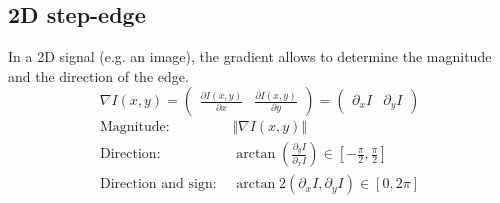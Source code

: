 \subsection{2D step-edge}

In a 2D signal (e.g. an image), the gradient allows to determine the magnitude and the direction of the edge.
\[ 
    \nabla I(x, y) = 
    \begin{pmatrix} \frac{\partial I(x, y)}{\partial x} & \frac{\partial I(x, y)}{\partial y} \end{pmatrix} =
    \begin{pmatrix} \partial_x I & \partial_y I \end{pmatrix}
\]
\[
    \begin{split}
        \text{Magnitude: } & \Vert \nabla I(x, y) \Vert \\
        \text{Direction: } & \arctan\left(\frac{\partial_y I}{\partial_x I}\right) \in [-\frac{\pi}{2}, \frac{\pi}{2}] \\
        \text{Direction and sign: } & \arctan2(\partial_x I, \partial_y I) \in [0, 2\pi] \\
    \end{split}  
\]

